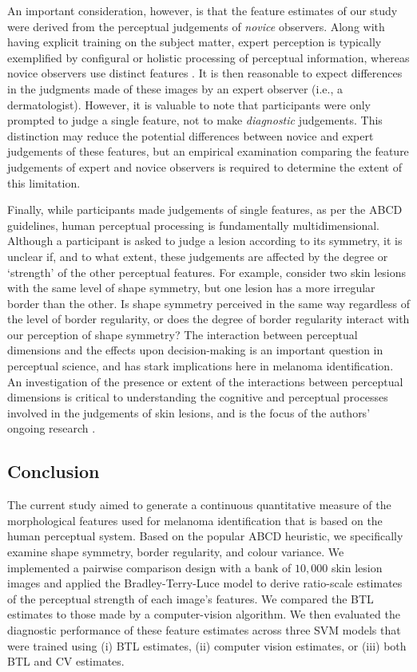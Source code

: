 \documentclass[
    man, 12pt, a4paper,
    donotrepeattitle, floatsintext, draftfirst
]{apa7}
\begin{document}
An important consideration, however, is that the feature estimates of our study were derived from the perceptual judgements of \textit{novice} observers. Along with having explicit training on the subject matter, expert perception is typically exemplified by configural or holistic processing of perceptual information, whereas novice observers use distinct features \parencite{garrett2022wheel}. It is then reasonable to expect differences in the judgments made of these images by an expert observer (i.e., a dermatologist). However, it is valuable to note that participants were only prompted to judge a single feature, not to make \textit{diagnostic} judgements. This distinction may reduce the potential differences between novice and expert judgements of these features, but an empirical examination comparing the feature judgements of expert and novice observers is required to determine the extent of this limitation.

Finally, while participants made judgements of single features, as per the ABCD guidelines, human perceptual processing is fundamentally multidimensional. Although a participant is asked to judge a lesion according to its symmetry, it is unclear if, and to what extent, these judgements are affected by the degree or `strength' of the other perceptual features. For example, consider two skin lesions with the same level of shape symmetry, but one lesion has a more irregular border than the other. Is shape symmetry perceived in the same way regardless of the level of border regularity, or does the degree of border regularity interact with our perception of shape symmetry? The interaction between perceptual dimensions and the effects upon decision-making is an important question in perceptual science, and has stark implications here in melanoma identification. An investigation of the presence or extent of the interactions between perceptual dimensions is critical to understanding the cognitive and perceptual processes involved in the judgements of skin lesions, and is the focus of the authors' ongoing research \parencite{ourgrt2024preprint}.

\subsection{Conclusion}
The current study aimed to generate a continuous quantitative measure of the morphological features used for melanoma identification that is based on the human perceptual system. Based on the popular ABCD heuristic, we specifically examine shape symmetry, border regularity, and colour variance. We implemented a pairwise comparison design with a bank of $10,000$ skin lesion images and applied the Bradley-Terry-Luce model to derive ratio-scale estimates of the perceptual strength of each image's features. We compared the BTL estimates to those made by a computer-vision algorithm. We then evaluated the diagnostic performance of these feature estimates across three SVM models that were trained using (i) BTL estimates, (ii) computer vision estimates, or (iii) both BTL and CV estimates.
\end{document}
